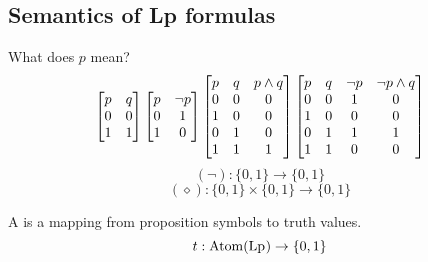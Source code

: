 \documentclass[12pt]{article}
\begin{document}
\subsection{Semantics of Lp formulas}

What does \(p\) mean?
\[\begin{bmatrix} 
    p & q\\
    0 & 0\\
    1 & 1
 \end{bmatrix}
\begin{bmatrix} 
  p & \neg p\\
  0 & 1\\
  1 & 0
 \end{bmatrix}
\begin{bmatrix} 
  p & q & p\wedge q\\
  0 & 0 & 0\\
  1 & 0 & 0\\
  0 & 1 & 0\\
  1 & 1 & 1
 \end{bmatrix}
\begin{bmatrix} 
  p & q &\neg p& \neg p\wedge q\\
  0 & 0 & 1 & 0\\
  1 & 0 & 0 & 0\\
  0 & 1 & 1 & 1\\
  1 & 1 & 0 & 0
 \end{bmatrix}
\]
\[(\neg):\{0,1\}\to\{0,1\}\]
\[(\diamond):\{0,1\}\times\{0,1\}\to\{0,1\}\]

\bbox
\begin{defn}\label{defn:truth_evaluation}
  A  is a mapping from proposition symbols to
  truth values.
  \[t:\mathrm{Atom}(\mathrm{Lp_{}})\to\{0,1\}\]
\end{defn}
\ebox
\end{document}
